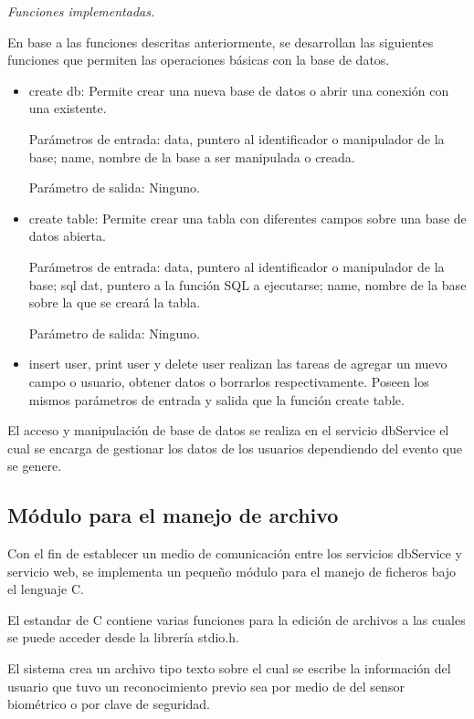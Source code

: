 \textsl{Funciones implementadas.}

En base a las funciones descritas anteriormente, se desarrollan las siguientes funciones que permiten las operaciones básicas con la base de datos.

\begin{itemize}
\item create db: Permite crear una nueva base de datos o abrir una conexión con una existente.

Parámetros de entrada: data, puntero al identificador o manipulador de la base; name, nombre de la base a ser manipulada o creada. 

Parámetro de salida: Ninguno.

\item create table: Permite crear una tabla con diferentes campos sobre una base de datos abierta.

Parámetros de entrada: 	data, puntero al identificador o manipulador de la base; sql dat, puntero a la función SQL a ejecutarse; name, nombre de la base sobre la que se creará la tabla.

Parámetro de salida: Ninguno.

\item insert user, print user y delete user realizan las tareas de agregar un nuevo campo o usuario, obtener datos o borrarlos respectivamente. Poseen los mismos parámetros de entrada y salida que la función create table.

\end{itemize}

El acceso y manipulación de base de datos se realiza en el servicio dbService el cual se encarga de gestionar los datos de los usuarios dependiendo del evento que se genere.

\subsection{Módulo para el manejo de archivo}

Con el fin de establecer un medio de comunicación entre los servicios dbService y  servicio web, se implementa un pequeño módulo para el manejo de ficheros bajo el lenguaje C.

El estandar de C contiene varias funciones para la edición de archivos a las cuales se puede acceder desde la librería stdio.h.

El sistema crea un archivo tipo texto sobre el cual se escribe la información del usuario que tuvo un reconocimiento previo sea por medio de del sensor biométrico o por clave de seguridad.

